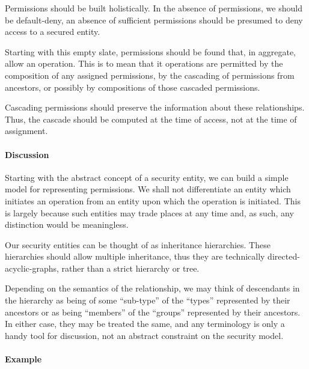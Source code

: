 Permissions should be built holistically.  In the absence of permissions, we should be default-deny, an absence of sufficient permissions should be presumed to deny access to a secured entity.

Starting with this empty slate, permissions should be found that, in aggregate, allow an operation.  This is to mean that it operations are permitted by the composition of any assigned permissions, by the cascading of permissions from ancestors, or possibly by compositions of those cascaded permissions.

Cascading permissions should preserve the information about these relationships.  Thus, the cascade should be computed at the time of access, not at the time of assignment.

\paragraph{Discussion}

Starting with the abstract concept of a security entity, we can build a simple model for representing permissions.  We shall not differentiate an entity which initiates an operation from an entity upon which the operation is initiated.  This is largely because such entities may trade places at any time and, as such, any distinction would be meaningless.

Our security entities can be thought of as inheritance hierarchies.  These hierarchies should allow multiple inheritance, thus they are technically directed-acyclic-graphs, rather than a strict hierarchy or tree.

Depending on the semantics of the relationship, we may think of descendants in the hierarchy as being of some ``sub-type'' of the ``types'' represented by their ancestors or as being ``members'' of the ``groups'' represented by their ancestors.  In either case, they may be treated the same, and any terminology is only a handy tool for discussion, not an abstract constraint on the security model.

\paragraph{Example}

